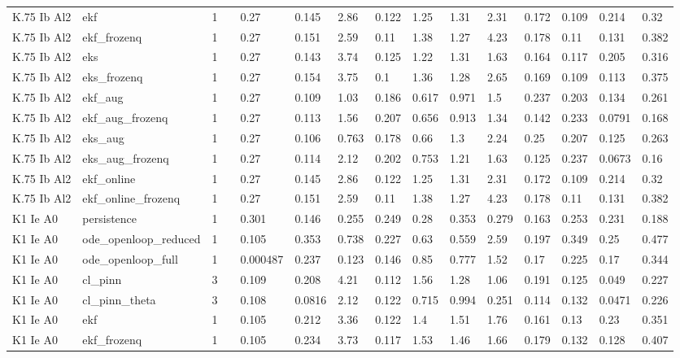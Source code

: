 \begin{table}[t]
\begin{tabular}{lllllllllllllll}
K.75 Ib Al2 & ekf & 1 &  & 0.27 & 0.145 & 2.86 & 0.122 & 1.25 & 1.31 & 2.31 & 0.172 & 0.109 & 0.214 & 0.32 \\
K.75 Ib Al2 & ekf\_frozenq & 1 &  & 0.27 & 0.151 & 2.59 & 0.11 & 1.38 & 1.27 & 4.23 & 0.178 & 0.11 & 0.131 & 0.382 \\
K.75 Ib Al2 & eks & 1 &  & 0.27 & 0.143 & 3.74 & 0.125 & 1.22 & 1.31 & 1.63 & 0.164 & 0.117 & 0.205 & 0.316 \\
K.75 Ib Al2 & eks\_frozenq & 1 &  & 0.27 & 0.154 & 3.75 & 0.1 & 1.36 & 1.28 & 2.65 & 0.169 & 0.109 & 0.113 & 0.375 \\
K.75 Ib Al2 & ekf\_aug & 1 &  & 0.27 & 0.109 & 1.03 & 0.186 & 0.617 & 0.971 & 1.5 & 0.237 & 0.203 & 0.134 & 0.261 \\
K.75 Ib Al2 & ekf\_aug\_frozenq & 1 &  & 0.27 & 0.113 & 1.56 & 0.207 & 0.656 & 0.913 & 1.34 & 0.142 & 0.233 & 0.0791 & 0.168 \\
K.75 Ib Al2 & eks\_aug & 1 &  & 0.27 & 0.106 & 0.763 & 0.178 & 0.66 & 1.3 & 2.24 & 0.25 & 0.207 & 0.125 & 0.263 \\
K.75 Ib Al2 & eks\_aug\_frozenq & 1 &  & 0.27 & 0.114 & 2.12 & 0.202 & 0.753 & 1.21 & 1.63 & 0.125 & 0.237 & 0.0673 & 0.16 \\
K.75 Ib Al2 & ekf\_online & 1 &  & 0.27 & 0.145 & 2.86 & 0.122 & 1.25 & 1.31 & 2.31 & 0.172 & 0.109 & 0.214 & 0.32 \\
K.75 Ib Al2 & ekf\_online\_frozenq & 1 &  & 0.27 & 0.151 & 2.59 & 0.11 & 1.38 & 1.27 & 4.23 & 0.178 & 0.11 & 0.131 & 0.382 \\
K1 Ie A0 & persistence & 1 &  & 0.301 & 0.146 & 0.255 & 0.249 & 0.28 & 0.353 & 0.279 & 0.163 & 0.253 & 0.231 & 0.188 \\
K1 Ie A0 & ode\_openloop\_reduced & 1 &  & 0.105 & 0.353 & 0.738 & 0.227 & 0.63 & 0.559 & 2.59 & 0.197 & 0.349 & 0.25 & 0.477 \\
K1 Ie A0 & ode\_openloop\_full & 1 &  & 0.000487 & 0.237 & 0.123 & 0.146 & 0.85 & 0.777 & 1.52 & 0.17 & 0.225 & 0.17 & 0.344 \\
K1 Ie A0 & cl\_pinn & 3 &  & 0.109 & 0.208 & 4.21 & 0.112 & 1.56 & 1.28 & 1.06 & 0.191 & 0.125 & 0.049 & 0.227 \\
K1 Ie A0 & cl\_pinn\_theta & 3 &  & 0.108 & 0.0816 & 2.12 & 0.122 & 0.715 & 0.994 & 0.251 & 0.114 & 0.132 & 0.0471 & 0.226 \\
K1 Ie A0 & ekf & 1 &  & 0.105 & 0.212 & 3.36 & 0.122 & 1.4 & 1.51 & 1.76 & 0.161 & 0.13 & 0.23 & 0.351 \\
K1 Ie A0 & ekf\_frozenq & 1 &  & 0.105 & 0.234 & 3.73 & 0.117 & 1.53 & 1.46 & 1.66 & 0.179 & 0.132 & 0.128 & 0.407 \\

\end{tabular}
\end{table}
